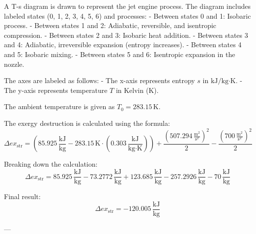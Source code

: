 A T-s diagram is drawn to represent the jet engine process. The diagram includes labeled states (0, 1, 2, 3, 4, 5, 6) and processes:  
- Between states 0 and 1: Isobaric process.  
- Between states 1 and 2: Adiabatic, reversible, and isentropic compression.  
- Between states 2 and 3: Isobaric heat addition.  
- Between states 3 and 4: Adiabatic, irreversible expansion (entropy increases).  
- Between states 4 and 5: Isobaric mixing.  
- Between states 5 and 6: Isentropic expansion in the nozzle.  

The axes are labeled as follows:  
- The x-axis represents entropy \( s \) in \( \text{kJ}/\text{kg·K} \).  
- The y-axis represents temperature \( T \) in Kelvin (K).

The ambient temperature is given as \( T_0 = 283.15 \, \text{K} \).  

The exergy destruction is calculated using the formula:  
\[
\Delta ex_{\text{str}} = \left( 85.925 \, \frac{\text{kJ}}{\text{kg}} - 283.15 \, \text{K} \cdot \left( 0.303 \, \frac{\text{kJ}}{\text{kg·K}} \right) \right) + \frac{\left( 507.294 \, \frac{\text{m}^2}{\text{s}^2} \right)^2}{2} - \frac{\left( 700 \, \frac{\text{m}^2}{\text{s}^2} \right)^2}{2}
\]

Breaking down the calculation:  
\[
\Delta ex_{\text{str}} = 85.925 \, \frac{\text{kJ}}{\text{kg}} - 73.2772 \, \frac{\text{kJ}}{\text{kg}} + 123.685 \, \frac{\text{kJ}}{\text{kg}} - 257.2926 \, \frac{\text{kJ}}{\text{kg}} - 70 \, \frac{\text{kJ}}{\text{kg}}
\]

Final result:  
\[
\Delta ex_{\text{str}} = -120.005 \, \frac{\text{kJ}}{\text{kg}}
\]

---